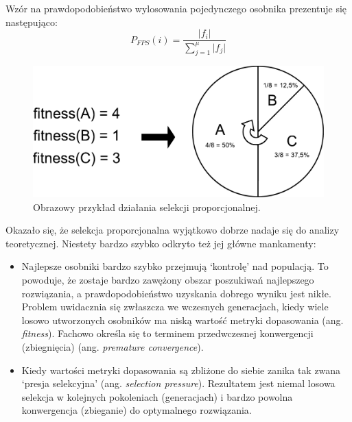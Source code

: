 \documentclass[a4paper,11pt]{article}
\begin{document}
    \bigskip

    \noindent
    \begin{minipage}[H]{\textwidth}
        \setlength\parindent{17pt} Wzór na prawdopodobieństwo wylosowania pojedynczego osobnika prezentuje się następująco: \\
        \begin{equation}
            \label{eq:fitness_proportionate_selection}
            P_{FPS}(i) = \frac{\lvert f_{i} \rvert}{\sum_{j=1}^{\mu} \lvert f_{j} \rvert}
        \end{equation}
    \end{minipage}

    \bigskip

    \begin{figure}[H]
        \label{fig:proportional_selection}
        \centering
        \includegraphics[width=\textwidth]{proportional_selection}
        \caption{Obrazowy przykład działania selekcji proporcjonalnej.}
    \end{figure}

    \bigskip

    Okazało się, że selekcja proporcjonalna wyjątkowo dobrze nadaje się do analizy teoretycznej. Niestety bardzo szybko odkryto też jej główne mankamenty\cite{IntroductionToEvolutionaryComputing2015}:
    \begin{itemize}
        \item Najlepsze osobniki bardzo szybko przejmują `kontrolę' nad populacją. To powoduje, że zostaje bardzo zawężony obszar poszukiwań najlepszego rozwiązania, a prawdopodobieństwo uzyskania dobrego wyniku jest nikłe. Problem uwidacznia się zwłaszcza we wczesnych generacjach, kiedy wiele losowo utworzonych osobników ma niską wartość metryki dopasowania (ang. \textit{fitness}). Fachowo określa się to terminem przedwczesnej konwergencji (zbiegnięcia) (ang. \textit{premature convergence}).
        \item Kiedy wartości metryki dopasowania są zbliżone do siebie zanika tak zwana `presja selekcyjna' (ang. \textit{selection pressure}). Rezultatem jest niemal losowa selekcja w kolejnych pokoleniach (generacjach) i bardzo powolna konwergencja (zbieganie) do optymalnego rozwiązania.
    \end{itemize}
\end{document}
